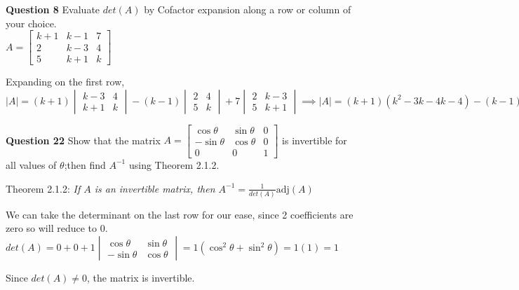 \documentclass[addpoints]{exam}
\begin{document}
\begin{sloppypar}
\begin{questions}
    \question
    \textbf{Question 8} Evaluate $ det(A) $ by Cofactor expansion along a row or column of your choice. \\ $ A = \begin{bmatrix}
        k+1 & k-1 & 7 \\ 2 & k-3 & 4 \\ 5 & k+1 & k
    \end{bmatrix} $
    \begin{solution}
        Expanding on the first row, $|A| = (k+1)\begin{vmatrix}
            k-3 & 4 \\ k+1 & k
        \end{vmatrix} - (k-1)\begin{vmatrix}
            2 & 4 \\ 5 & k
        \end{vmatrix} + 7\begin{vmatrix}
            2 & k-3 \\ 5 & k+1
        \end{vmatrix} \implies |A| = (k+1)(k^2 - 3k -4k - 4) - (k-1)(2k - 20) + 7(2k+1 - 5k + 15) = (k+1)(k^2 -7k - 4) - (2k^2 -22k +20) + (-21k + 112) = k^3 -6k^2 -11k - 4 -2k^2 +22k - 20 -21k + 112 = k^3 -8k^2 -10k + 88$ 
    \end{solution}

    \question
    \textbf{Question 22} Show that the matrix $ A = \begin{bmatrix}
        \cos\theta & \sin\theta & 0 \\ -\sin\theta & \cos\theta & 0 \\ 0 & 0 & 1
    \end{bmatrix} $ is invertible for all values of $\theta$;then find $ A^{-1} $ using Theorem 2.1.2. 
    \begin{solution}
        
        Theorem 2.1.2: \textit{If $A$ is an invertible matrix, then $ A^{-1} = \displaystyle\frac{1}{det(A)}\text{adj}(A) $}

        We can take the determinant on the last row for our ease, since 2 coefficients are zero so will reduce to 0. \\ 
        $det(A) = 0 + 0 + 1\begin{vmatrix}
            \cos\theta & \sin\theta \\ -\sin\theta & \cos\theta
        \end{vmatrix} = 1(\cos^2\theta + \sin^2\theta) = 1(1) = 1$

        Since $ det(A) \neq 0 $, the matrix is invertible. 


\end{solution}
\end{questions}
\end{sloppypar}
\end{document}

